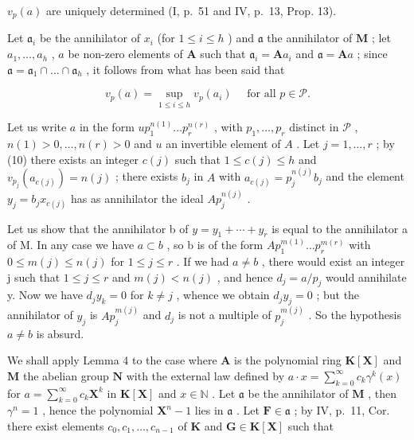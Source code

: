 \(v_{p}(a)\) are uniquely determined (I, p.~51 and IV, p.~13, Prop. 13).

Let \(\mathfrak{a}_i\) be the annihilator of \(x_i\) (for \(1 \leqslant i \leqslant h\) ) and \(\mathfrak{a}\) the annihilator of \(\mathbf{M}\) ; let \(a_1, \ldots, a_h\) , \(a\) be non-zero elements of \(\mathbf{A}\) such that \(\mathfrak{a}_i = \mathbf{A}a_i\) and \(\mathfrak{a} = \mathbf{A}a\) ; since \(\mathfrak{a} = \mathfrak{a}_1 \cap \ldots \cap \mathfrak{a}_h\) , it follows from what has been said that

\[
v _ {p} (a) = \sup _ {1 \leqslant i \leqslant h} v _ {p} (a _ {i}) \quad \text { for   all } p \in \mathscr {P}.\tag{10}
\]

Let us write \(a\) in the form \(up_1^{n(1)} \ldots p_r^{n(r)}\) , with \(p_1, \ldots, p_r\) distinct in \(\mathcal{P}\) , \(n(1) > 0, \ldots, n(r) > 0\) and \(u\) an invertible element of \(A\) . Let \(j = 1, \ldots, r\) ; by (10) there exists an integer \(c(j)\) such that \(1 \leqslant c(j) \leqslant h\) and \(v_{p_j}(a_{c(j)}) = n(j)\) ; there exists \(b_j\) in \(A\) with \(a_{c(j)} = p_j^{n(j)}b_j\) and the element \(y_j = b_jx_{c(j)}\) has as annihilator the ideal \(Ap_j^{n(j)}\) .

Let us show that the annihilator b of \(y = y_{1} + \cdots + y_{r}\) is equal to the annihilator a of M. In any case we have \(a \subset b\) , so b is of the form \(Ap_{1}^{m(1)} \ldots p_{r}^{m(r)}\) with \(0 \leqslant m(j) \leqslant n(j)\) for \(1 \leqslant j \leqslant r\) . If we had \(a \neq b\) , there would exist an integer j such that \(1 \leqslant j \leqslant r\) and \(m(j) < n(j)\) , and hence \(d_{j} = a/p_{j}\) would annihilate y. Now we have \(d_{j}y_{k} = 0\) for \(k \neq j\) , whence we obtain \(d_{j}y_{j} = 0\) ; but the annihilator of \(y_{j}\) is \(Ap_{j}^{m(j)}\) and \(d_{j}\) is not a multiple of \(p_{j}^{m(j)}\) . So the hypothesis \(a \neq b\) is absurd.

We shall apply Lemma 4 to the case where \(\mathbf{A}\) is the polynomial ring \(\mathbf{K}[\mathbf{X}]\) and \(\mathbf{M}\) the abelian group \(\mathbf{N}\) with the external law defined by \(a \cdot x = \sum_{k=0}^{\infty} c_k \gamma^k(x)\) for \(a = \sum_{k=0}^{\infty} c_k \mathbf{X}^k\) in \(\mathbf{K}[\mathbf{X}]\) and \(x \in \mathbb{N}\) . Let \(\mathfrak{a}\) be the annihilator of \(\mathbf{M}\) , then \(\gamma^n = 1\) , hence the polynomial \(\mathbf{X}^n - 1\) lies in \(\mathfrak{a}\) . Let \(\mathbf{F} \in \mathfrak{a}\) ; by IV, p.~11, Cor. there exist elements \(c_0, c_1, \ldots, c_{n-1}\) of \(\mathbf{K}\) and \(\mathbf{G} \in \mathbf{K}[\mathbf{X}]\) such that

